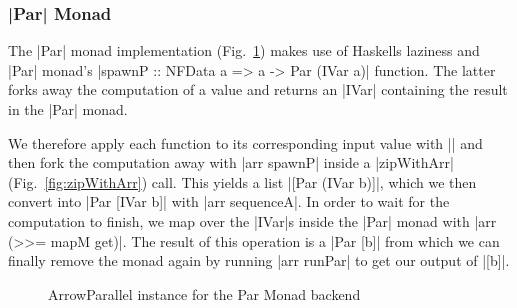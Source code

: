 \subsubsection{|Par| Monad}
The |Par| monad implementation (Fig.~\ref{fig:ArrowParallelParMonad}) makes use of Haskells laziness and |Par| monad's |spawnP :: NFData a => a -> Par (IVar a)| function. The latter forks away the computation of a value and returns an |IVar| containing the result in the |Par| monad.


We therefore apply each function to its corresponding input value with || and then fork the computation away with |arr spawnP| inside a |zipWithArr| (Fig.~\ref{fig:zipWithArr}) call. This yields a list |[Par (IVar b)]|, which we then convert into |Par [IVar b]| with |arr sequenceA|. In order to wait for the computation to finish, we map over the |IVar|s inside the |Par| monad with |arr (>>= mapM get)|. The result of this operation is a |Par [b]| from which we can finally remove the monad again by running |arr runPar| to get our output of |[b]|.
\begin{figure}[h]
\caption{ArrowParallel instance for the Par Monad backend}
\label{fig:ArrowParallelParMonad}
\end{figure}

